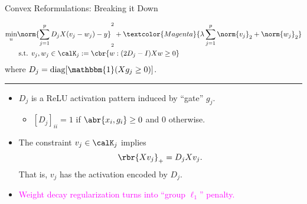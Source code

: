 \documentclass[usenames,dvipsnames,mathserif,notheorems]{beamer}
\newcommand{\horizontalrule}{
	{
			\vspace{-0.5em}
			\center \rule{\textwidth}{0.1em}
			\vspace{-0.2em}
		}
}
\newcommand{\purple}[1]{\textcolor{Magenta}{#1}}
\begin{document}
\begin{frame}{Convex Reformulations: Breaking it Down}

	\[
		\begin{aligned}
			\min_{u} & \norm{\sum_{j=1}^p D_j X (v_j - w_j) - y}_2^2 +
			\purple{\lambda \sum_{j=1}^p \norm{v_j}_2 + \norm{w_j}_2}  \\
			         & \hspace{0.2em} \text{s.t. }
			v_j, w_j \in \calK_j := \cbr{w : (2D_j - I) X w \geq 0}
		\end{aligned}
	\]
	where \( D_j = \text{diag}[\mathbbm{1}(X g_j \geq 0)] \).

	\horizontalrule

	\begin{itemize}
		\item \( D_j \) is a ReLU activation pattern induced by ``gate'' \( g_j \).
		      \begin{itemize}
			      \item \([D_j]_{ii} = 1\) if \( \abr{x_i, g_i} \geq 0 \) and \( 0 \) otherwise.
		      \end{itemize}
		\item The constraint \( v_j \in \calK_j \) implies
		      \[
			      \rbr{X v_j}_+ = D_j X v_j.
		      \]
		      That is, \( v_j \) has the activation encoded by \( D_j \).
		\item \purple{Weight decay regularization turns into ``group \( \ell_1 \)'' penalty.}
	\end{itemize}
	\vspace{6em}
\end{frame}
\end{document}
